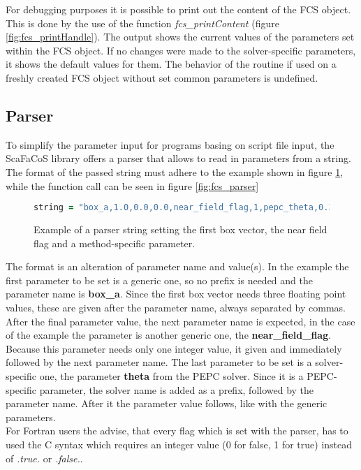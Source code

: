 For debugging purposes it is possible to print out the content of the FCS object. This is done by the use of the function \textit{fcs\_printContent} (figure \ref{fig:fcs_printHandle}).
The output shows the current values of the parameters set within the FCS object. If no changes were made to the solver-specific parameters, it shows the default
values for them. The behavior of the routine if used on a freshly created FCS object without set common parameters is undefined.

\subsection{Parser}
\label{sec:interface_parser}

To simplify the parameter input for programs basing on script file input, the ScaFaCoS library offers a parser that allows to read in parameters from a string.
The format of the passed string must adhere to the example shown in figure \ref{fig:parser_example}, while the function call can be seen in figure \ref{fig:fcs_parser}

\begin{figure}[htb]
\begin{lstlisting}[language=Fortran,frame=trBL,breaklines,basicstyle=\small,prebreak={\raisebox{0ex}[0ex][0ex]{\ensuremath{\hookleftarrow}}}]
string = "box_a,1.0,0.0,0.0,near_field_flag,1,pepc_theta,0.3"
\end{lstlisting}
\caption{Example of a parser string setting the first box vector, the near field flag and a method-specific parameter.}
\label{fig:parser_example}
\end{figure}

The format is an alteration of parameter name and value(s). In the example the first parameter to be set is a generic one, so no prefix is needed and the parameter
name is \textbf{box\_a}. Since the first box vector needs three floating point values, these are given after the parameter name, always separated by commas.
After the final parameter value, the next parameter name is expected, in the case of the example the parameter is another generic one, the \textbf{near\_field\_flag}.
Because this parameter needs only one integer value, it given and immediately followed by the next parameter name. The last parameter to be set is a solver-specific
one, the parameter \textbf{theta} from the PEPC solver. Since it is a PEPC-specific parameter, the solver name is added as a prefix, followed by the parameter name.
After it the parameter value follows, like with the generic parameters.\\
For Fortran users the advise, that every flag which is set with the parser, has to used the C syntax which requires an integer value (0 for false, 1 for true) instead
of \textit{.true.} or \textit{.false.}.

\FloatBarrier
\renewcommand\arraystretch{1.0}
